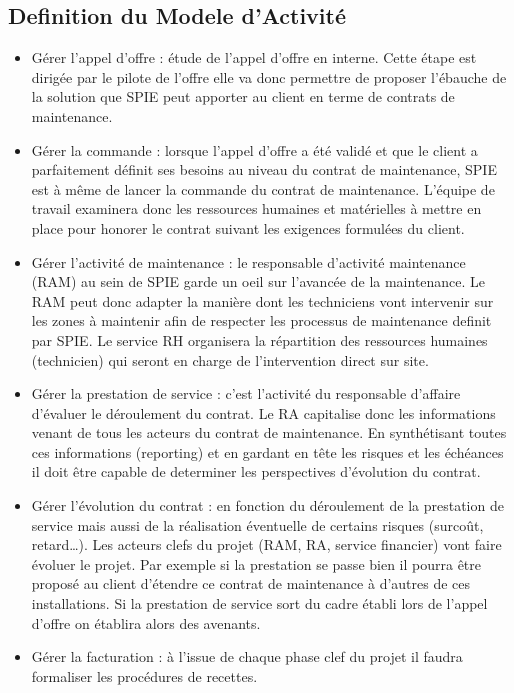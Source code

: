 \subsection{Definition du Modele d'Activité} 

\begin{itemize}
\item Gérer l'appel d'offre : étude de l'appel d'offre en interne. Cette étape est dirigée par le pilote de l'offre elle va donc permettre de proposer l'ébauche de la solution que SPIE peut apporter au client en terme de contrats de maintenance.
\item Gérer la commande : lorsque l'appel d'offre a été validé et que le client a parfaitement définit ses besoins au niveau du contrat de maintenance, SPIE est à même de lancer la \og commande \fg du contrat de maintenance. L'équipe de travail examinera donc les ressources humaines et matérielles à mettre en place pour honorer le contrat suivant les exigences formulées du client.
\item Gérer l'activité de maintenance : le responsable d'activité maintenance (RAM) au sein de SPIE garde un oeil sur l'avancée de la maintenance. Le RAM peut donc adapter la manière dont les techniciens vont intervenir sur les zones à maintenir afin de respecter les processus de maintenance definit par SPIE. Le service RH organisera la répartition des ressources humaines (technicien) qui seront en charge de l'intervention direct sur site.
\item Gérer la prestation de service : c'est l'activité du responsable d'affaire d'évaluer le déroulement du contrat. Le RA capitalise donc les informations venant de tous les acteurs du contrat de maintenance. En synthétisant toutes ces informations (reporting) et en gardant en tête les risques et les échéances il doit être capable de determiner les perspectives d'évolution du contrat.
\item Gérer l'évolution du contrat : en fonction du déroulement de la prestation de service mais aussi de la réalisation éventuelle de certains risques (surcoût, retard…). Les acteurs clefs du projet (RAM, RA, service financier) vont faire évoluer le projet. Par exemple si la prestation se passe bien il pourra être proposé au client d'étendre ce contrat de maintenance à d'autres de ces installations. Si la prestation de service sort du cadre établi lors de l'appel d'offre on établira alors des avenants.
\item Gérer la facturation : à l'issue de chaque phase clef du projet il faudra formaliser les procédures de recettes. 
\end{itemize}

